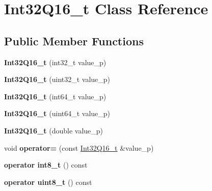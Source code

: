 \hypertarget{class_int32_q16__t}{}\section{Int32\+Q16\+\_\+t Class Reference}
\label{class_int32_q16__t}
\subsection*{Public Member Functions}
\begin{DoxyCompactItemize}
\item 
\hypertarget{class_int32_q16__t_a25662ee14bc02f9e50e9e6c40ed899b9}{}{\bfseries Int32\+Q16\+\_\+t} (int32\+\_\+t value\+\_\+p)\label{class_int32_q16__t_a25662ee14bc02f9e50e9e6c40ed899b9}

\item 
\hypertarget{class_int32_q16__t_a7d602ca0a683b0bd544e89d12255948f}{}{\bfseries Int32\+Q16\+\_\+t} (uint32\+\_\+t value\+\_\+p)\label{class_int32_q16__t_a7d602ca0a683b0bd544e89d12255948f}

\item 
\hypertarget{class_int32_q16__t_a021772b5d9cfa677a62b263080cbac52}{}{\bfseries Int32\+Q16\+\_\+t} (int64\+\_\+t value\+\_\+p)\label{class_int32_q16__t_a021772b5d9cfa677a62b263080cbac52}

\item 
\hypertarget{class_int32_q16__t_a512041f5e8bc6cbb643c13a1fa14593d}{}{\bfseries Int32\+Q16\+\_\+t} (uint64\+\_\+t value\+\_\+p)\label{class_int32_q16__t_a512041f5e8bc6cbb643c13a1fa14593d}

\item 
\hypertarget{class_int32_q16__t_a286dcda0b4d371e3d18fd208ec3513c1}{}{\bfseries Int32\+Q16\+\_\+t} (double value\+\_\+p)\label{class_int32_q16__t_a286dcda0b4d371e3d18fd208ec3513c1}

\item 
\hypertarget{class_int32_q16__t_ab26f2715759ccb6507ca2292a026030f}{}void {\bfseries operator=} (const \hyperlink{class_int32_q16__t}{Int32\+Q16\+\_\+t} \&value\+\_\+p)\label{class_int32_q16__t_ab26f2715759ccb6507ca2292a026030f}

\item 
\hypertarget{class_int32_q16__t_ae1c7bd0cad6a73483c8fa41b2ab471c5}{}{\bfseries operator int8\+\_\+t} () const \label{class_int32_q16__t_ae1c7bd0cad6a73483c8fa41b2ab471c5}

\item 
\hypertarget{class_int32_q16__t_ac25bd32b411e822c0eae6c22a9f4a141}{}{\bfseries operator uint8\+\_\+t} () const \label{class_int32_q16__t_ac25bd32b411e822c0eae6c22a9f4a141}


\end{DoxyCompactItemize}

